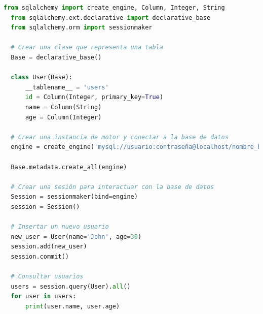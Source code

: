 \documentclass[12pt]{article}
\begin{document}
\begin{lstlisting}[language=Python]
  from sqlalchemy import create_engine, Column, Integer, String
  from sqlalchemy.ext.declarative import declarative_base
  from sqlalchemy.orm import sessionmaker

  # Crear una clase que representa una tabla
  Base = declarative_base()

  class User(Base):
      __tablename__ = 'users'
      id = Column(Integer, primary_key=True)
      name = Column(String)
      age = Column(Integer)

  # Crear una instancia de motor y conectar a la base de datos
  engine = create_engine('mysql://usuario:contraseña@localhost/nombre_base_de_datos', echo=True)

  Base.metadata.create_all(engine)

  # Crear una sesión para interactuar con la base de datos
  Session = sessionmaker(bind=engine)
  session = Session()

  # Insertar un nuevo usuario
  new_user = User(name='John', age=30)
  session.add(new_user)
  session.commit()

  # Consultar usuarios
  users = session.query(User).all()
  for user in users:
      print(user.name, user.age)

\end{lstlisting}
\end{document}
